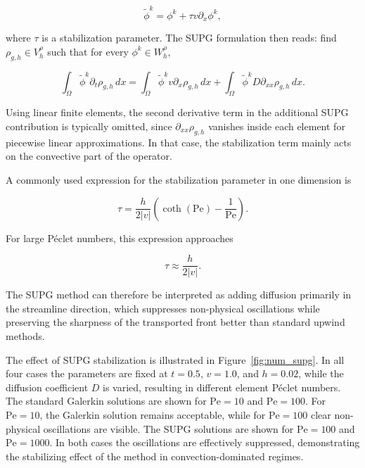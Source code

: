 \begin{equation}
    \tilde{\phi}^k = \phi^k + \tau v \partial_x \phi^k,
\end{equation}

where \(\tau\) is a stabilization parameter. The SUPG formulation then reads: find \(\rho_{g,h} \in V_h^\rho\) such that for every \(\phi^k \in W_h^\rho\),

\begin{equation}
    \int_\Omega \tilde{\phi}^k \partial_t \rho_{g,h}\,dx
    =
    \int_\Omega \tilde{\phi}^k v \partial_x \rho_{g,h}\,dx
    +
    \int_\Omega \tilde{\phi}^k D \partial_{xx}\rho_{g,h}\,dx.
\end{equation}

Using linear finite elements, the second derivative term in the additional SUPG contribution is typically omitted, since \(\partial_{xx}\rho_{g,h}\) vanishes inside each element for piecewise linear approximations. In that case, the stabilization term mainly acts on the convective part of the operator.

A commonly used expression for the stabilization parameter in one dimension is

\begin{equation}
    \tau
    =
    \frac{h}{2|v|}
    \left(
    \coth(\mathrm{Pe}) - \frac{1}{\mathrm{Pe}}
    \right).
\end{equation}

For large P\'eclet numbers, this expression approaches

\begin{equation}
    \tau \approx \frac{h}{2|v|}.
\end{equation}

The SUPG method can therefore be interpreted as adding diffusion primarily in the streamline direction, which suppresses non-physical oscillations while preserving the sharpness of the transported front better than standard upwind methods.

The effect of SUPG stabilization is illustrated in Figure~\ref{fig:num_supg}. In all four cases the parameters are fixed at \(t=0.5\), \(v=1.0\), and \(h=0.02\), while the diffusion coefficient \(D\) is varied, resulting in different element P\'eclet numbers. The standard Galerkin solutions are shown for \(\mathrm{Pe}=10\) and \(\mathrm{Pe}=100\). For \(\mathrm{Pe}=10\), the Galerkin solution remains acceptable, while for \(\mathrm{Pe}=100\) clear non-physical oscillations are visible. The SUPG solutions are shown for \(\mathrm{Pe}=100\) and \(\mathrm{Pe}=1000\). In both cases the oscillations are effectively suppressed, demonstrating the stabilizing effect of the method in convection-dominated regimes.

